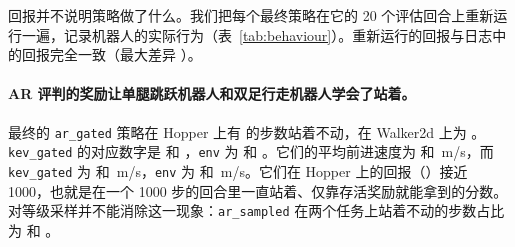 回报并不说明策略做了什么。我们把每个最终策略在它的 20 个评估回合上重新运行一遍，记录机器人的实际行为（表~\ref{tab:behaviour}）。重新运行的回报与日志中的回报完全一致（最大差异 ）。

\begin{table}[t]
\centering\small

\caption{最终策略的行为，对回合和种子取平均（每个 run 20 个评估回合）。\emph{still}：$|v_x|<0.1$\,m/s 的步数占比。\emph{runs flipped}：猎豹有一半以上步数背朝下（$\cos(\text{pitch})<0$）的 run 数。\emph{effort}：动作平方的均值，取值于 $[0,1]$。\emph{distance}：一个回合中指尖到目标的平均距离。随机策略从均匀分布中采样动作。}
\label{tab:behaviour}
\end{table}

\begin{table}[t]
\centering\small

\caption{在 \S\ref{sec:agreement} 的窗口（\texttt{env} 条件的 run 记录的窗口）上，每种信号给“站着”相对于“跑”的报酬。表中数值为：未摔倒且慢于 \,m/s 的窗口上的均值，除以快于 \,m/s 的窗口上的均值。\emph{env.\ reward}：逐步环境奖励。}
\label{tab:slowfast}
\end{table}

\paragraph{AR 评判的奖励让单腿跳跃机器人和双足行走机器人学会了站着。} 最终的 \texttt{ar\_gated} 策略在 Hopper 上有  的步数站着不动，在 Walker2d 上为 。\texttt{kev\_gated} 的对应数字是  和 ，\texttt{env} 为  和 。它们的平均前进速度为  和 \,m/s，而 \texttt{kev\_gated} 为  和 \,m/s，\texttt{env} 为  和 \,m/s。它们在 Hopper 上的回报（）接近 1000，也就是在一个 1000 步的回合里一直站着、仅靠存活奖励就能拿到的分数。对等级采样并不能消除这一现象：\texttt{ar\_sampled} 在两个任务上站着不动的步数占比为  和 。

